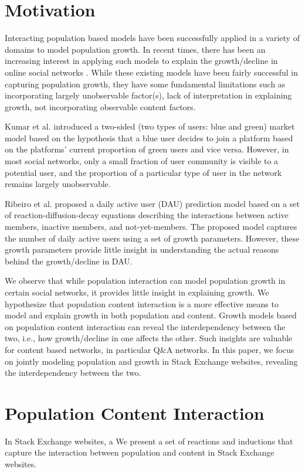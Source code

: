 \section{Motivation}
Interacting population based models have been successfully applied in a variety of domains to model population growth. In recent times, there has been an increasing interest in applying such models to explain the growth/decline in online social networks \cite{Ribeiro2014,Kumar2010}. While these existing models have been fairly successful in capturing population growth, they have some fundamental limitations such as incorporating largely unobservable factor(s), lack of interpretation in explaining growth, not incorporating observable content factors. %

Kumar et al. \cite{Kumar2010} introduced a two-sided (two types of users: blue and green) market model based on the hypothesis that a blue user decides to join a platform based on the platforms' current proportion of green users and vice versa. However, in most social networks, only a small fraction of user community is visible to a potential user, and the proportion of a particular type of user in the network remains largely unobservable. 

Ribeiro et al. \cite{Ribeiro2014} proposed a daily active user (DAU) prediction model based on a set of reaction-diffusion-decay equations describing the interactions between active members, inactive members, and not-yet-members. The proposed model captures the number of daily active users using a set of growth parameters. However, these growth parameters provide little insight in understanding the actual reasons behind the growth/decline in DAU. 

We observe that while population interaction can model population growth in certain social networks, it provides little insight in explaining growth. We hypothesize that population content interaction is a more effective means to model and explain growth in both population and content. Growth models based on population content interaction can reveal the interdependency between the two, i.e., how growth/decline in one affects the other. Such insights are valuable for content based networks, in particular Q\&A networks. In this paper, we focus on jointly modeling population and growth in Stack Exchange websites, revealing the interdependency between the two.

\section{Population Content Interaction}
In Stack Exchange websites, a We present a set of reactions and inductions that capture the interaction between population and content in Stack Exchange websites. 
